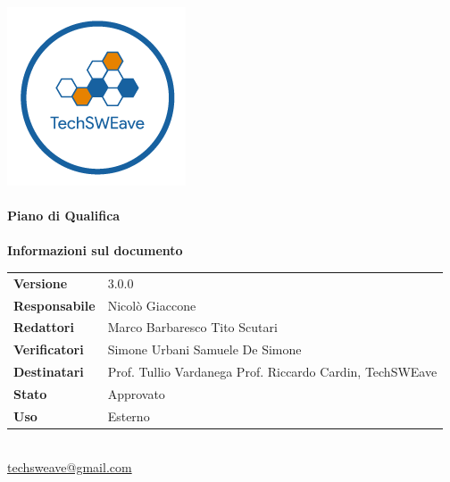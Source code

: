 \documentclass[a4paper]{article}
\begin{document}
\begin{titlepage}
    \begin{center}
        \includegraphics{../../../Images/logo}\\
        \vspace{20px}
        \textcolor{logo}{\hrulefill}\\
        \vspace{20px}
        \textbf{\huge\textcolor{logo}{Piano di Qualifica}}\\
        \vspace{10px}
        \textcolor{logo}{\hrulefill}\\
        \vspace{40px}
        \textbf{\Large Informazioni sul documento}\\
        \vspace{20px}
        \begin{tabular}{p{100px} | p{100px}}
            \textbf{Versione}     & 3.0.0                                                                      \\
            \textbf{Responsabile} & Nicolò Giaccone                                                            \\
            \textbf{Redattori}    & Marco Barbaresco \newline Tito Scutari                                     \\
            \textbf{Verificatori} & Simone Urbani \newline Samuele De Simone                                   \\
            \textbf{Destinatari}  & Prof. Tullio Vardanega \newline Prof. Riccardo Cardin, \newline TechSWEave \\
            \textbf{Stato}        & Approvato                                                                  \\
            \textbf{Uso}          & Esterno                                                                    \\
        \end{tabular}\\
        \vspace{60px}
        \href{mailto:techsweave@gmail.com}{techsweave@gmail.com}\\

    \end{center}
\end{titlepage}
\end{document}
